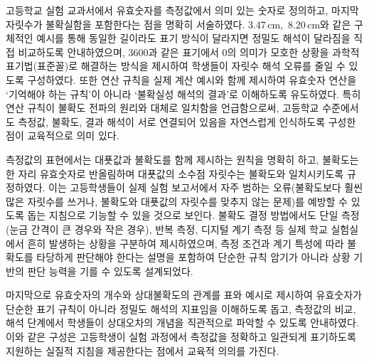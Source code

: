 고등학교 실험 교과서에서 유효숫자를 측정값에서 의미 있는 숫자로 정의하고,
마지막 자릿수가 불확실함을 포함한다는 점을 명확히 서술하였다.
%
3.47\,cm,\, 8.20\,cm와 같은 구체적인 예시를 통해 동일한 길이라도 표기 방식이 달라지면
정밀도 해석이 달라짐을 직접 비교하도록 안내하였으며,
3600과 같은 표기에서 0의 의미가 모호한 상황을 과학적 표기법(표준꼴)로
해결하는 방식을 제시하여 학생들이 자릿수 해석 오류를 줄일 수 있도록 구성하였다.
%
또한 연산 규칙을 실제 계산 예시와 함께 제시하여
유효숫자 연산을 `기억해야 하는 규칙'이 아니라 `불확실성 해석의 결과'로 이해하도록 유도하였다.
특히 연산 규칙이 불확도 전파의 원리와 대체로 일치함을 언급함으로써,
고등학교 수준에서도 측정값, 불확도, 결과 해석이 서로 연결되어 있음을 자연스럽게 인식하도록
구성한 점이 교육적으로 의미 있다.

측정값의 표현에서는 대푯값과 불확도를 함께 제시하는 원칙을 명확히 하고,
불확도는 한 자리 유효숫자로 반올림하며 대푯값의 소수점 자릿수는 불확도와 일치시키도록 규정하였다.
이는 고등학생들이 실제 실험 보고서에서 자주 범하는 오류(불확도보다 훨씬 많은 자릿수를 쓰거나,
불확도와 대푯값의 자릿수를 맞추지 않는 문제)를 예방할 수 있도록 돕는 지침으로 기능할 수 있을 것으로 보인다.
%
불확도 결정 방법에서도 단일 측정(눈금 간격이 큰 경우와 작은 경우),
반복 측정, 디지털 계기 측정 등 실제 학교 실험실에서 흔히 발생하는 상황을 구분하여 제시하였으며,
측정 조건과 계기 특성에 따라 불확도를 타당하게 판단해야 한다는 설명을 포함하여
단순한 규칙 암기가 아니라 상황 기반의 판단 능력을 기를 수 있도록 설계되었다.

마지막으로 유효숫자의 개수와 상대불확도의 관계를 표와 예시로 제시하여
유효숫자가 단순한 표기 규칙이 아니라 정밀도 해석의 지표임을 이해하도록 돕고,
측정값의 비교, 해석 단계에서 학생들이 상대오차의 개념을 직관적으로 파악할 수 있도록 안내하였다.
%
이와 같은 구성은 고등학생이 실험 과정에서 측정값을 정확하고 일관되게 표기하도록
지원하는 실질적 지침을 제공한다는 점에서 교육적 의의를 가진다.